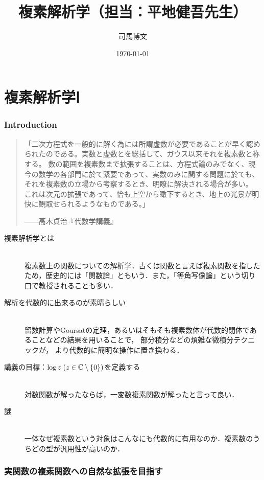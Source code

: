 \documentclass[uplatex, dvipdfmx]{jsreport}
\title{複素解析学（担当：平地健吾先生）}
\author{司馬博文}
\date{\today}
\begin{document}
\tableofcontents

\part{複素解析学Ⅰ}

\section*{Introduction}

\begin{quotation}
    「二次方程式を一般的に解く為には所謂虚数が必要であることが早く認められたのである。実数と虚数とを総括して、ガウス以来それを複素数と称する。
    数の範囲を複素数まで拡張することは、方程式論のみでなく、現今の数学の各部門に於て緊要であって、実数のみに関する問題に於ても、それを複素数の立場から考察するとき、明瞭に解決される場合が多い。
    これは次元の拡張であって、恰も上空から瞰下するとき、地上の光景が明快に観取せられるようなものである。」
    \begin{flushright}
        ――高木貞治『代数学講義』
    \end{flushright}
\end{quotation}

\begin{description}
    \item[複素解析学とは]\mbox{}\\
        複素数上の関数についての解析学．古くは関数と言えば複素関数を指したため，歴史的には「関数論」ともいう．また，「等角写像論」という切り口で教授されることも多い．
    \item[解析を代数的に出来るのが素晴らしい]\mbox{}\\
        留数計算やGoursatの定理，あるいはそもそも複素数体が代数的閉体であることなどの結果を用いることで，
        部分積分などの煩雑な微積分テクニックが，
        より代数的に簡明な操作に置き換わる．
    \item[講義の目標：$\log z\;(z\in\mathbb{C}\setminus\{0\})$を定義する]\mbox{}\\
        対数関数が解ったならば，一変数複素関数が解ったと言って良い．
    \item[謎]\mbox{}\\
        一体なぜ複素数という対象はこんなにも代数的に有用なのか．複素数のうちどの型が汎用性が高いのか．
\end{description}

\section*{実関数の複素関数への自然な拡張を目指す}
\end{document}
